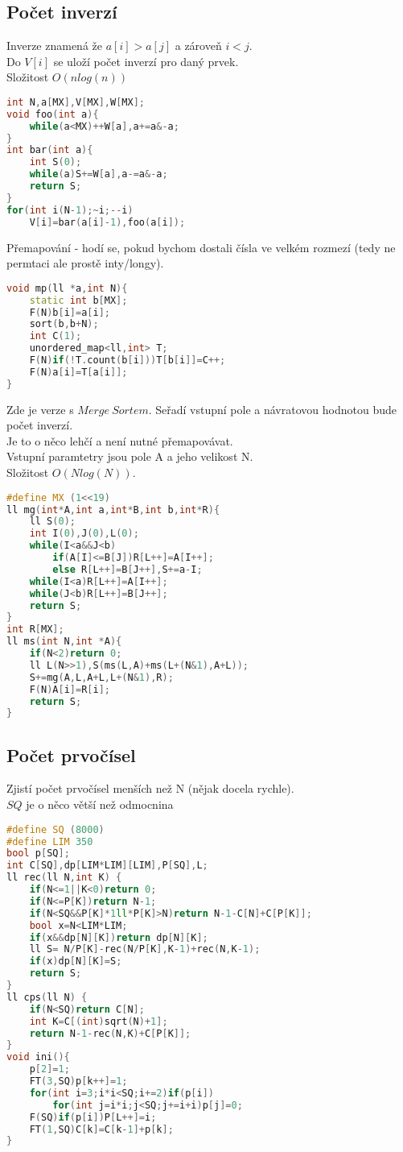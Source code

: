 \documentclass[11pt]{article}
\begin{document}
\subsection{Počet inverzí}
Inverze znamená že $a[i]>a[j]$ a zároveň $i<j$.
\\Do $V[i]$ se uloží počet inverzí pro daný prvek.
\\Složitost $O(nlog(n))$
\begin{lstlisting}[language=C++]
int N,a[MX],V[MX],W[MX];
void foo(int a){
    while(a<MX)++W[a],a+=a&-a;
}
int bar(int a){
    int S(0);
    while(a)S+=W[a],a-=a&-a;
    return S;
}
for(int i(N-1);~i;--i)
    V[i]=bar(a[i]-1),foo(a[i]);
\end{lstlisting}
Přemapování - hodí se, pokud bychom dostali čísla ve velkém rozmezí (tedy ne permtaci ale prostě inty/longy).
\begin{lstlisting}[language=C++]
void mp(ll *a,int N){
    static int b[MX];
    F(N)b[i]=a[i];
    sort(b,b+N);
    int C(1);
    unordered_map<ll,int> T;
    F(N)if(!T.count(b[i]))T[b[i]]=C++;
    F(N)a[i]=T[a[i]];
}
\end{lstlisting}
Zde je verze s $Merge\ Sortem$. Seřadí vstupní pole a návratovou hodnotou bude počet inverzí.
\\Je to o něco lehčí a není nutné přemapovávat.
\\Vstupní paramtetry jsou pole \textsf{A} a jeho velikost \textsf{N}.
\\Složitost $O(Nlog(N))$.
\begin{lstlisting}[language=C++]
#define MX (1<<19)
ll mg(int*A,int a,int*B,int b,int*R){
    ll S(0);
    int I(0),J(0),L(0);
    while(I<a&&J<b)
        if(A[I]<=B[J])R[L++]=A[I++];
        else R[L++]=B[J++],S+=a-I;
    while(I<a)R[L++]=A[I++];
    while(J<b)R[L++]=B[J++];
    return S;
}
int R[MX];
ll ms(int N,int *A){
    if(N<2)return 0;
    ll L(N>>1),S(ms(L,A)+ms(L+(N&1),A+L));
    S+=mg(A,L,A+L,L+(N&1),R);
    F(N)A[i]=R[i];
    return S;
}
\end{lstlisting}
\subsection{Počet prvočísel}
Zjistí počet prvočísel menších než \textsf{N} (nějak docela rychle).
\\$SQ$ je o něco větší než odmocnina
\begin{lstlisting}[language=C++]
#define SQ (8000)
#define LIM 350
bool p[SQ];
int C[SQ],dp[LIM*LIM][LIM],P[SQ],L;
ll rec(ll N,int K) {
    if(N<=1||K<0)return 0;
    if(N<=P[K])return N-1;
    if(N<SQ&&P[K]*1ll*P[K]>N)return N-1-C[N]+C[P[K]];
    bool x=N<LIM*LIM;
    if(x&&dp[N][K])return dp[N][K];
    ll S= N/P[K]-rec(N/P[K],K-1)+rec(N,K-1);
    if(x)dp[N][K]=S;
    return S;
}
ll cps(ll N) {
    if(N<SQ)return C[N];
    int K=C[(int)sqrt(N)+1];
    return N-1-rec(N,K)+C[P[K]];
}
void ini(){
    p[2]=1;
    FT(3,SQ)p[k++]=1;
    for(int i=3;i*i<SQ;i+=2)if(p[i])
        for(int j=i*i;j<SQ;j+=i+i)p[j]=0;
    F(SQ)if(p[i])P[L++]=i;
    FT(1,SQ)C[k]=C[k-1]+p[k];
}
\end{lstlisting}
\end{document}
